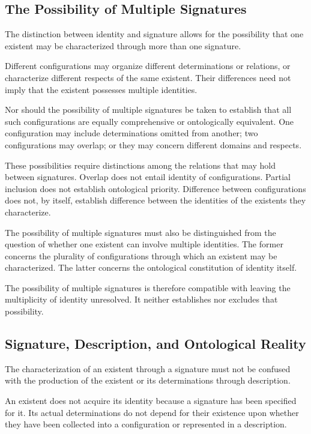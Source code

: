 \subsection{The Possibility of Multiple Signatures}

The distinction between identity and signature
allows for the possibility that one existent may
be characterized through more than one signature.

Different configurations may organize different
determinations or relations, or characterize
different respects of the same existent. Their
differences need not imply that the existent
possesses multiple identities.

Nor should the possibility of multiple signatures
be taken to establish that all such configurations
are equally comprehensive or ontologically
equivalent. One configuration may include
determinations omitted from another; two
configurations may overlap; or they may concern
different domains and respects.

These possibilities require distinctions among
the relations that may hold between signatures.
Overlap does not entail identity of configurations.
Partial inclusion does not establish ontological
priority. Difference between configurations
does not, by itself, establish difference between
the identities of the existents they characterize.

The possibility of multiple signatures must also
be distinguished from the question of whether
one existent can involve multiple identities.
The former concerns the plurality of configurations
through which an existent may be characterized.
The latter concerns the ontological constitution
of identity itself.

The possibility of multiple signatures is therefore
compatible with leaving the multiplicity of identity
unresolved. It neither establishes nor excludes
that possibility.

\subsection{Signature, Description, and Ontological Reality}

The characterization of an existent through a
signature must not be confused with the production
of the existent or its determinations through
description.

An existent does not acquire its identity because
a signature has been specified for it. Its actual
determinations do not depend for their existence
upon whether they have been collected into a
configuration or represented in a description.


